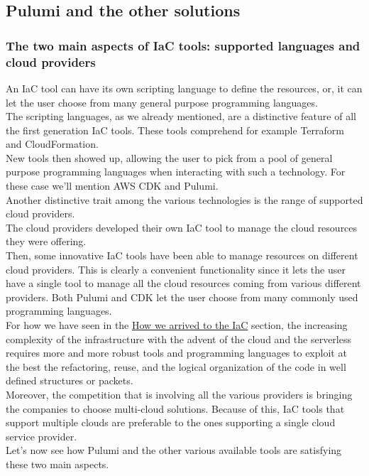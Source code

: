 \subsection{Pulumi and the other solutions}

\subsubsection{The two main aspects of IaC tools: supported languages and cloud providers}
An IaC tool can have its own scripting language to define the resources, or, it can let the user choose from many general purpose programming languages.\\
The scripting languages, as we already mentioned, are a distinctive feature of all the first generation IaC tools.
These tools comprehend for example Terraform and CloudFormation.\\
New tools then showed up, allowing the user to pick from a pool of general purpose programming languages when interacting with such a technology.
For these case we'll mention AWS CDK and Pulumi.\\
\newline
Another distinctive trait among the various technologies is the range of supported cloud providers.\\
The cloud providers developed their own IaC tool to manage the cloud resources they were offering.\\
Then, some innovative IaC tools have been able to manage resources on different cloud providers.
This is clearly a convenient functionality since it lets the user have a single tool to manage all the cloud resources coming from various different providers.
Both Pulumi and CDK let the user choose from many commonly used programming languages.\\
\newline
For how we have seen in the \hyperref[sec:story-iac]{How we arrived to the IaC} section, the increasing complexity of the infrastructure with the advent of the cloud and the serverless requires more and more robust tools and programming languages to exploit at the best the refactoring, reuse, and the logical organization of the code in well defined structures or packets.\\
Moreover, the competition that is involving all the various providers is bringing the companies to choose multi-cloud solutions. Because of this, IaC tools that support multiple clouds are preferable to the ones supporting a single cloud service provider.\\
Let's now see how Pulumi and the other various available tools are satisfying these two main aspects.

